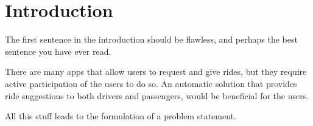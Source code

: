 \chapter{Introduction}\label{ch:introduction}

The first sentence in the introduction should be flawless, and perhaps the best sentence you have ever read.

There are many apps that allow users to request and give rides, but they require active participation of the users to do so. An automatic solution that provides ride suggestions to both drivers and passengers, would be beneficial for the users. 

All this stuff leads to the formulation of a problem statement.